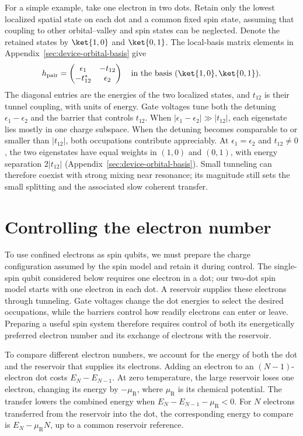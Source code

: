 For a simple example, take one electron in two dots. Retain only
the lowest localized spatial state on each dot and a common fixed
spin state, assuming that coupling to other orbital--valley and spin
states can be neglected. Denote the retained states by
$\ket{1,0}$ and $\ket{0,1}$. The local-basis matrix elements in
Appendix~\ref{sec:device-orbital-basis} give
\begin{equation}
 h_{\mathrm{pair}}=
 \begin{pmatrix}
  \epsilon_1&-t_{12}\\
  -t_{12}^*&\epsilon_2
 \end{pmatrix}
 \quad\text{in the basis }(\ket{1,0},\ket{0,1}).
 \label{eq:dot-pair-hamiltonian}
\end{equation}
The diagonal entries are the energies of the two localized states,
and $t_{12}$ is their tunnel coupling, with units of energy. Gate
voltages tune both the detuning $\epsilon_1-\epsilon_2$ and the
barrier that controls $t_{12}$.
When $|\epsilon_1-\epsilon_2|\gg|t_{12}|$, each eigenstate lies
mostly in one charge subspace. When the detuning becomes comparable
to or smaller than $|t_{12}|$, both occupations contribute
appreciably. At $\epsilon_1=\epsilon_2$ and $t_{12}\ne0$, the two
eigenstates have equal weights in $(1,0)$ and $(0,1)$, with energy
separation $2|t_{12}|$ (Appendix~\ref{sec:device-orbital-basis}).
Small tunneling can therefore coexist with strong mixing near
resonance; its magnitude still sets the small splitting and the
associated slow coherent transfer.

\section{Controlling the electron number}
\label{sec:electron-number-control}

To use confined electrons as spin qubits, we must prepare the charge
configuration assumed by the spin model and retain it during control.
The single-spin qubit considered below requires one electron in a dot;
our two-dot spin model starts with one electron in each dot. A reservoir
supplies these electrons through tunneling. Gate voltages change the
dot energies to select the desired occupations, while the barriers
control how readily electrons can enter or leave. Preparing a useful
spin system therefore requires control of both its energetically
preferred electron number and its exchange of electrons with the reservoir.

To compare different electron numbers, we account for the energy of
both the dot and the reservoir that supplies its electrons. Adding
an electron to an $(N-1)$-electron dot costs $E_N-E_{N-1}$.
At zero temperature, the large reservoir loses one electron, changing
its energy by $-\mu_{\mathrm R}$, where $\mu_{\mathrm R}$ is its chemical potential.
The transfer lowers the combined energy when
$E_N-E_{N-1}-\mu_{\mathrm R}<0$. For $N$ electrons transferred
from the reservoir into the dot, the corresponding energy to compare
is $E_N-\mu_{\mathrm R}N$, up to a common reservoir reference.

